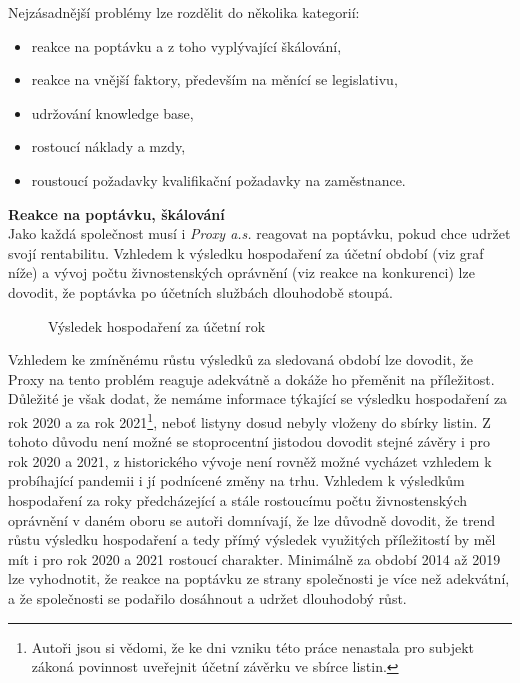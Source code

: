 Nejzásadnější problémy lze rozdělit do několika kategorií:\\

\begin{itemize}
	\item reakce na poptávku a z toho vyplývající škálování,
	\item reakce na vnější faktory, především na měnící se legislativu,
	\item udržování knowledge base,
	\item rostoucí náklady a mzdy,
	\item roustoucí požadavky kvalifikační požadavky na zaměstnance.
\end{itemize}

\vspace*{5mm}

\newpage

\textbf{Reakce na poptávku, škálování}\\

Jako každá společnost musí i \textit{Proxy a.s.} reagovat na poptávku, pokud chce udržet svojí rentabilitu. Vzhledem k výsledku hospodaření za účetní období (viz graf níže) a vývoj počtu živnostenských oprávnění (viz reakce na konkurenci) lze dovodit, že poptávka po účetních službách dlouhodobě stoupá.

\begin{figure}[!htbp]
	\caption{Výsledek hospodaření za účetní rok}
	\label{fig:vhzur}
\end{figure}

Vzhledem ke zmíněnému růstu výsledků za sledovaná období lze dovodit, že Proxy na tento problém reaguje adekvátně a dokáže ho přeměnit na příležitost.\\

Důležité je však dodat, že nemáme informace týkající se výsledku hospodaření za rok 2020 a za rok 2021\footnote{Autoři jsou si vědomi, že ke dni vzniku této práce nenastala pro subjekt zákoná povinnost uveřejnit účetní závěrku ve sbírce listin.}, neboť listyny dosud nebyly vloženy do sbírky listin. Z tohoto důvodu není možné se stoprocentní jistodou dovodit stejné závěry i pro rok 2020 a 2021, z historického vývoje není rovněž možné vycházet vzhledem k probíhající pandemii i jí podnícené změny na trhu. Vzhledem k výsledkům hospodaření za roky předcházející a stále rostoucímu počtu živnostenských oprávnění v daném oboru se autoři domnívají, že lze důvodně dovodit, že trend růstu výsledku hospodaření a tedy přímý výsledek využitých příležitostí by měl mít i pro rok 2020 a 2021 rostoucí charakter. Minimálně za období 2014 až 2019 lze vyhodnotit, že reakce na poptávku ze strany společnosti je více než adekvátní, a že společnosti se podařilo dosáhnout a udržet dlouhodobý růst.\\

